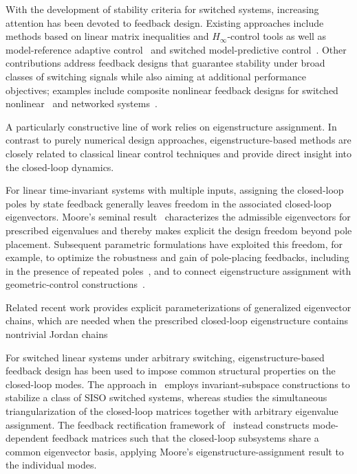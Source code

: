 \documentclass[11pt]{article}
\theoremstyle{plain}
\theoremstyle{definition}
\theoremstyle{remark}
\begin{document}
With the development of stability criteria for switched systems, increasing attention has been devoted to feedback design. Existing approaches include methods based on linear matrix inequalities \cite{Sun05} and $H_\infty$-control tools \cite{Deaecto11}
as well as model-reference adaptive control~\cite{YuanDSB2017} and switched model-predictive control~\cite{ZhangZB2016}. Other contributions address feedback designs that guarantee stability under broad classes of switching signals while also aiming at additional performance objectives; examples include composite nonlinear feedback designs for switched nonlinear~\cite{LinPB1998} and networked systems~\cite{li2018improved,zhao2022event}.

A particularly constructive line of work relies on eigenstructure assignment. In contrast to purely numerical design approaches, eigenstructure-based methods are closely related to classical linear control techniques and provide direct insight into the closed-loop dynamics.

For linear time-invariant systems with multiple inputs, assigning the
closed-loop poles by state feedback generally leaves freedom in the associated
closed-loop eigenvectors. Moore's seminal result~\cite{Moore76} characterizes
the admissible eigenvectors for prescribed eigenvalues and thereby makes
explicit the design freedom beyond pole placement. Subsequent parametric
formulations have exploited this freedom, for example, to optimize the
robustness and gain of pole-placing feedbacks, including in the presence of
repeated poles~\cite{Schmid14}, and to connect eigenstructure assignment with
geometric-control constructions~\cite{padula2021eigenstructure}.

Related recent work provides explicit parameterizations of generalized
eigenvector chains, which are needed when the prescribed closed-loop
eigenstructure contains nontrivial Jordan chains
\cite{maynard5761099parameterizing}

For switched linear systems under arbitrary switching, eigenstructure-based
feedback design has been used to impose common structural properties on the
closed-loop modes. The approach in~\cite{WulWirSho09} employs invariant-subspace
constructions to stabilize a class of SISO switched systems, whereas
\cite{Hai16} studies the simultaneous triangularization of the closed-loop
matrices together with arbitrary eigenvalue assignment. The feedback
rectification framework of~\cite{HoneckerGWTR24} instead constructs
mode-dependent feedback matrices such that the closed-loop subsystems share a
common eigenvector basis, applying Moore's eigenstructure-assignment result to
the individual modes.
\end{document}
